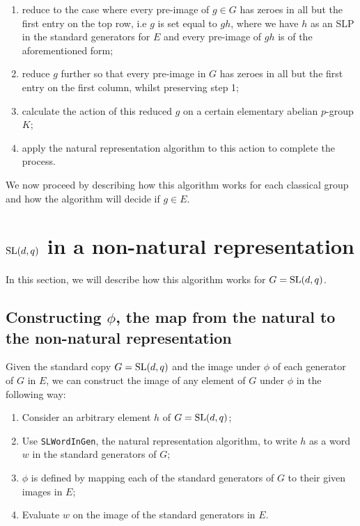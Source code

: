 \documentclass[12pt]{report}
\def\SL{{\rm SL}}
\begin{document}
\begin{enumerate}
\item reduce to the case where every pre-image of $g \in G$ has zeroes in all but the first entry on the top row, i.e $g$ is set equal to $gh$, where we have $h$ as an SLP in the standard generators for $E$ and every pre-image of $gh$ is of the aforementioned form;
\item reduce $g$ further so that every pre-image in $G$ has zeroes in all but the first entry on the first column, whilst preserving step 1;
\item calculate the action of this reduced $g$ on a certain elementary abelian $p$-group $K$;
\item apply the natural representation algorithm to this action to complete the process.
\end{enumerate}

We now proceed by describing how this algorithm works for each classical group and how the algorithm will decide if $g \in E$.

\section{$\SL(d, q)$ in a non-natural representation}

In this section, we will describe how this algorithm works for $G = \SL(d, q)$.

\subsection{Constructing $\phi$, the map from the natural to the non-natural representation}

Given the standard copy $G = \SL(d, q)$ and the image under $\phi$ of each generator of $G$ in $E$, we can construct the image of any element of $G$ under $\phi$ in the following way:

\begin{enumerate}
\item Consider an arbitrary element $h$ of $G = \SL(d, q)$;
\item Use {\tt SLWordInGen}, the natural representation algorithm, to write $h$ as a word $w$ in the standard generators of $G$;
\item $\phi$ is defined by mapping each of the standard generators of $G$ to their given images in $E$;
\item Evaluate $w$ on the image of the standard generators in $E$.
\end{enumerate}
\end{document}
